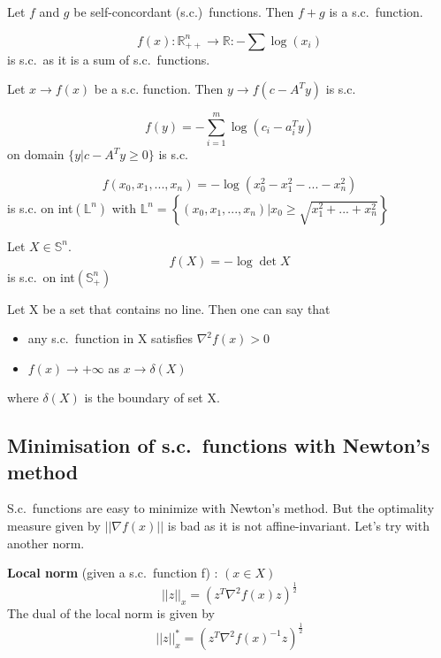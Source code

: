 \begin{property}
Let $f$ and $g$ be self-concordant (s.c.)\ functions. Then $f+g$ is a s.c.\ function.
\end{property}

\begin{example}
\begin{leftbar}
$$f(x) : \mathbb{R}_{++}^n \rightarrow \mathbb{R} : -\sum \log{(x_i)}$$ is s.c.\ as it is a sum of s.c.\ functions.
\end{leftbar}
\end{example}

\begin{property}
Let $x \rightarrow f(x)$ be a s.c. function. Then $y \rightarrow f(c-A^Ty)$ is s.c.\
\end{property}

\begin{example}
\begin{leftbar}
$$f(y) = - \sum\limits_{i=1}^m \log{(c_i-a_i^Ty)}$$ on domain $\{y|c-A^Ty \geq 0\}$ is s.c.\
\end{leftbar}
\end{example}

\begin{example}
\begin{leftbar}
$$f(x_0,x_1,...,x_n) = -\log{(x_0^2-x_1^2-...-x_n^2)}$$ is s.c. on int$(\mathbb{L}^n)$ with $\mathbb{L}^n = \left\{(x_0,x_1,...,x_n) | x_0 \geq \sqrt{x_1^2+...+x_n^2}\right\}$
\end{leftbar}
\end{example}

\begin{example}
\begin{leftbar}
Let $X \in \mathbb{S}^n$.
$$f(X) = -\log{\det{X}}$$
is s.c.\ on int$(\mathbb{S}_+^n)$
\end{leftbar}
\end{example}

\begin{property}
Let X be a set that contains no line. Then one can say that
\begin{itemize}
\item any s.c.\ function in X satisfies $\nabla^2 f(x) > 0$
\item $f(x) \rightarrow + \infty$ as $x \rightarrow \delta(X)$
\end{itemize}
where $\delta(X)$ is the boundary of set X.
\end{property}

\subsection{Minimisation of s.c.\ functions with Newton's method}
S.c.\ functions are easy to minimize with Newton's method. But the optimality measure given by $|| \nabla f(x) ||$ is bad as it is not affine-invariant. Let's try with another norm.
\begin{definition} \textbf{Local norm} (given a s.c.\ function f) : $(x \in X)$ 
$$
||z||_x  = (z^T \nabla^2f(x)z)^{\frac{1}{2}}
$$
The dual of the local norm is given by
$$
||z||^*_x  = (z^T \nabla^2f(x)^{-1}z)^{\frac{1}{2}}
$$
\end{definition}

